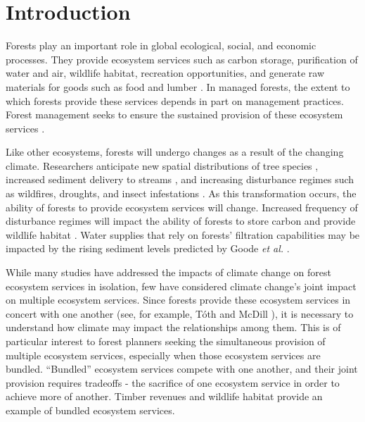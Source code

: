 
\section{Introduction}
\label{sec:intro}
 
Forests play an important role in global ecological, social, and economic processes. They provide ecosystem services such as carbon storage, purification of water and air, wildlife habitat, recreation opportunities, and generate raw materials for goods such as food and lumber \cite{daily1997ecosystem}. In managed forests, the extent to which forests provide these services depends in part on management practices. Forest management seeks to ensure the sustained provision of these ecosystem services \cite{cfrForestMgmt}.

Like other ecosystems, forests will undergo changes as a result of the changing climate. Researchers anticipate new spatial distributions of tree species \cite{iverson1998predicting}, increased sediment delivery to streams \cite{Goode20121}, and increasing disturbance regimes such as wildfires, droughts, and insect infestations \cite{vose2012effects}. As this transformation occurs, the ability of forests to provide ecosystem services will change. Increased frequency of disturbance regimes will impact the ability of forests to store carbon \cite{bonan2008forests} and provide wildlife habitat \cite{mckenzie2004climatic}. Water supplies that rely on forests' filtration capabilities may be impacted by the rising sediment levels predicted by Goode \textit{et al.} \cite{Goode20121}.

While many studies have addressed the impacts of climate change on forest ecosystem services in isolation\cite{vose2012effects}\cite{bonan2008forests}\cite{mckenzie2004climatic}, few have considered climate change's joint impact on multiple ecosystem services. Since forests provide these ecosystem services in concert with one another (see, for example, T{\'o}th and McDill \cite{toth2009finding}), it is necessary to understand how climate may impact the relationships among them. This is of particular interest to forest planners seeking the simultaneous provision of multiple ecosystem services, especially when those ecosystem services are bundled. ``Bundled'' ecosystem services compete with one another, and their joint provision requires tradeoffs - the sacrifice of one ecosystem service in order to achieve more of another. Timber revenues and wildlife habitat provide an example of bundled ecosystem services.%

